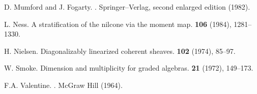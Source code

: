 \documentclass{article}
\begin{document}
\begin{thebibliography}{25}
  {D. Mumford and J. Fogarty.}
  .
  \newblock Springer--Verlag, second enlarged edition (1982).

  {L. Ness.}
  \newblock A stratification of the nilcone via the moment map.
   \textbf{106} (1984), 1281--1330.

  {H. Nielsen.}
  \newblock Diagonalizably linearized coherent sheaves.
   \textbf{102} (1974), 85--97.

  {W. Smoke.}
  \newblock Dimension and multiplicity for graded algebras.
   \textbf{21} (1972), 149--173.

  {F.A. Valentine.}
  .
  \newblock McGraw Hill (1964).

\end{thebibliography}
\end{document}
